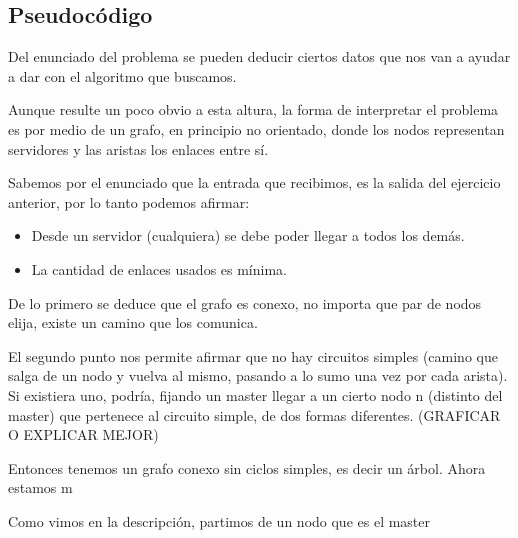 \subsection{Pseudocódigo}

Del enunciado del problema se pueden deducir ciertos datos que nos van a ayudar a dar con el algoritmo que buscamos.

Aunque resulte un poco obvio a esta altura, la forma de interpretar el problema es por medio de un grafo, en principio no orientado, donde los nodos representan servidores y las aristas los enlaces entre sí.

Sabemos por el enunciado que la entrada que recibimos, es la salida del ejercicio anterior, por lo tanto podemos afirmar:

\begin{itemize}
\item Desde un servidor (cualquiera) se debe poder llegar a todos los demás.
\item La cantidad de enlaces usados es mínima.
\end{itemize}

De lo primero se deduce que el grafo es conexo, no importa que par de nodos elija, existe un camino que los comunica.

El segundo punto nos permite afirmar que no hay circuitos simples (camino que salga de un nodo y vuelva al mismo, pasando a lo sumo una vez por cada arista). Si existiera uno, podría, fijando un master llegar a un cierto nodo n (distinto del master) que pertenece al circuito simple, de dos formas diferentes. (GRAFICAR O EXPLICAR MEJOR)

Entonces tenemos un grafo conexo sin ciclos simples, es decir un árbol. Ahora estamos m


Como vimos en la descripción, partimos de un nodo que es el master
